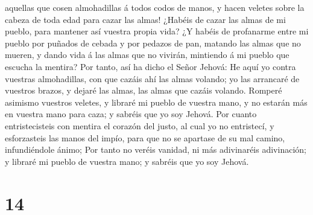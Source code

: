 aquellas que cosen almohadillas á todos codos de manos, y hacen veletes
sobre la cabeza de toda edad para cazar las almas! ¿Habéis de cazar las
almas de mi pueblo, para mantener así vuestra propia vida? 
¿Y habéis de profanarme entre mi pueblo por puñados de cebada y por
pedazos de pan, matando las almas que no mueren, y dando vida á las
almas que no vivirán, mintiendo á mi pueblo que escucha la mentira?
 Por tanto, así ha dicho el Señor Jehová: He aquí yo contra
vuestras almohadillas, con que cazáis ahí las almas volando; yo las
arrancaré de vuestros brazos, y dejaré las almas, las almas que cazáis
volando.  Romperé asimismo vuestros veletes, y libraré mi
pueblo de vuestra mano, y no estarán más en vuestra mano para caza; y
sabréis que yo soy Jehová.  Por cuanto entristecisteis con
mentira el corazón del justo, al cual yo no entristecí, y esforzasteis
las manos del impío, para que no se apartase de su mal camino,
infundiéndole ánimo;  Por tanto no veréis vanidad, ni más
adivinaréis adivinación; y libraré mi pueblo de vuestra mano; y sabréis
que yo soy Jehová.

\hypertarget{section-13}{%
\section{14}\label{section-13}}

